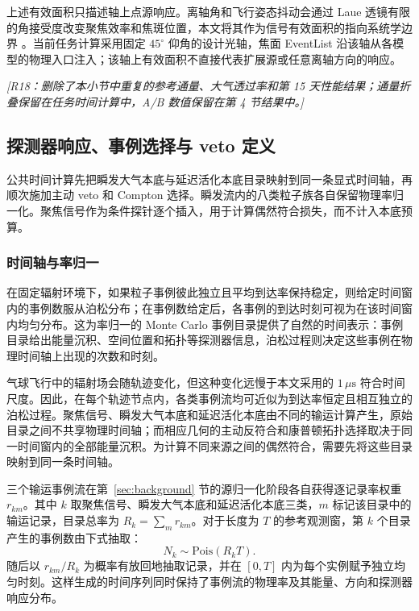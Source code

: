 \documentclass[11pt]{article}
\newcommand{\revdeleted}[1]{\par\noindent\textcolor{revisionblue}{\small\itshape [#1]}\par}
\newcommand{\revblue}[1]{\textcolor{revisionblue}{#1}}
\begin{document}
上述有效面积只描述轴上点源响应。离轴角和飞行姿态抖动会通过 Laue 透镜有限的角接受度改变聚焦效率和焦斑位置，本文将其作为信号有效面积的指向系统学边界 \cite{Barriere2009Laue,Weidenspointner2006MAX}。当前任务计算采用固定 $45^\circ$ 仰角的设计光轴，焦面 EventList 沿该轴从各模型的物理入口注入；该轴上有效面积不直接代表扩展源或任意离轴方向的响应。
\endgroup

\revdeleted{R18：删除了本小节中重复的参考通量、大气透过率和第 15 天性能结果；通量折叠保留在任务时间计算中，A/B 数值保留在第 4 节结果中。}

\subsection{探测器响应、事例选择与 veto 定义}
\label{sec:selection}

公共时间计算先把瞬发大气本底与延迟活化本底目录映射到同一条显式时间轴，再顺次施加主动 veto 和 Compton 选择。\revblue{瞬发流内的八类粒子族各自保留物理率归一化}。聚焦信号作为条件探针逐个插入，用于计算偶然符合损失，而不计入本底预算。

\subsubsection{时间轴与率归一}
\label{subsec:time_axis_zh}

在固定辐射环境下，如果粒子事例彼此独立且平均到达率保持稳定，则给定时间窗内的事例数服从泊松分布；在事例数给定后，各事例的到达时刻可视为在该时间窗内均匀分布。这为率归一的 Monte Carlo 事例目录提供了自然的时间表示：事例目录给出能量沉积、空间位置和拓扑等探测器信息，泊松过程则决定这些事例在物理时间轴上出现的次数和时刻。

气球飞行中的辐射场会随轨迹变化，但这种变化远慢于本文采用的 $1\,\mu\mathrm{s}$ 符合时间尺度。因此，在每个轨迹节点内，各类事例流均可近似为到达率恒定且相互独立的泊松过程。聚焦信号、瞬发大气本底和延迟活化本底由不同的输运计算产生，原始目录之间不共享物理时间轴；而相应几何的主动反符合和康普顿拓扑选择取决于同一时间窗内的全部能量沉积。为计算不同来源之间的偶然符合，需要先将这些目录映射到同一条时间轴。

三个输运事例流在第~\ref{sec:background} 节的源归一化阶段各自获得逐记录率权重 $r_{km}$。其中 $k$ 取聚焦信号、瞬发大气本底和延迟活化本底三类，$m$ 标记该目录中的输运记录，目录总率为 $R_k=\sum_m r_{km}$。对于长度为 $T$ 的参考观测窗，第 $k$ 个目录产生的事例数由下式抽取：
\begin{equation}
 N_k\sim\mathrm{Pois}(R_kT).
 \label{eq:poisson_superposition_zh}
\end{equation}
随后以 $r_{km}/R_k$ 为概率有放回地抽取记录，并在 $[0,T]$ 内为每个实例赋予独立均匀时刻。这样生成的时间序列同时保持了事例流的物理率及其能量、方向和探测器响应分布。
\end{document}
